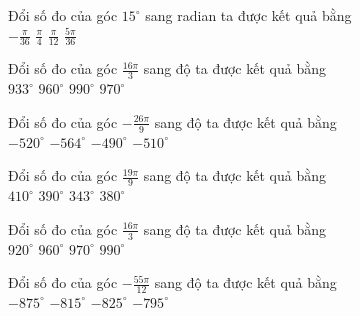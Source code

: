 \documentclass[12pt,a4paper]{article}
\begin{document}
\begin{ex}
 Đổi số đo của góc $15^\circ$ sang radian ta được kết quả bằng\\ 
\choice
{ $- \frac{\pi}{36}$ }
   { $\frac{\pi}{4}$ }
     { \True $\frac{\pi}{12}$ }
    { $\frac{5 \pi}{36}$ }
\end{ex}

\begin{ex}
 Đổi số đo của góc $\frac{16 \pi}{3}$ sang độ ta được kết quả bằng\\ 
\choice
{ $933^\circ$ }
   { \True $960^\circ$ }
     { $990^\circ$ }
    { $970^\circ$ }
\end{ex}

\begin{ex}
 Đổi số đo của góc $- \frac{26 \pi}{9}$ sang độ ta được kết quả bằng\\ 
\choice
{ \True $-520^\circ$ }
   { $-564^\circ$ }
     { $-490^\circ$ }
    { $-510^\circ$ }
\end{ex}

\begin{ex}
 Đổi số đo của góc $\frac{19 \pi}{9}$ sang độ ta được kết quả bằng\\ 
\choice
{ $410^\circ$ }
   { $390^\circ$ }
     { $343^\circ$ }
    { \True $380^\circ$ }
\end{ex}

\begin{ex}
 Đổi số đo của góc $\frac{16 \pi}{3}$ sang độ ta được kết quả bằng\\ 
\choice
{ $920^\circ$ }
   { \True $960^\circ$ }
     { $970^\circ$ }
    { $990^\circ$ }
\end{ex}

\begin{ex}
 Đổi số đo của góc $- \frac{55 \pi}{12}$ sang độ ta được kết quả bằng\\ 
\choice
{ $-875^\circ$ }
   { $-815^\circ$ }
     { \True $-825^\circ$ }
    { $-795^\circ$ }
\end{ex}
\end{document}
